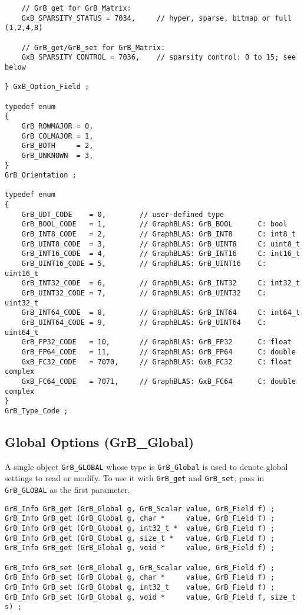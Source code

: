 {\begin{verbatim}
    // GrB_get for GrB_Matrix:
    GxB_SPARSITY_STATUS = 7034,     // hyper, sparse, bitmap or full (1,2,4,8)

    // GrB_get/GrB_set for GrB_Matrix:
    GxB_SPARSITY_CONTROL = 7036,    // sparsity control: 0 to 15; see below

} GxB_Option_Field ;

typedef enum
{
    GrB_ROWMAJOR = 0,
    GrB_COLMAJOR = 1,
    GrB_BOTH     = 2,
    GrB_UNKNOWN  = 3,
}
GrB_Orientation ;

typedef enum
{
    GrB_UDT_CODE    = 0,        // user-defined type
    GrB_BOOL_CODE   = 1,        // GraphBLAS: GrB_BOOL      C: bool
    GrB_INT8_CODE   = 2,        // GraphBLAS: GrB_INT8      C: int8_t
    GrB_UINT8_CODE  = 3,        // GraphBLAS: GrB_UINT8     C: uint8_t
    GrB_INT16_CODE  = 4,        // GraphBLAS: GrB_INT16     C: int16_t
    GrB_UINT16_CODE = 5,        // GraphBLAS: GrB_UINT16    C: uint16_t
    GrB_INT32_CODE  = 6,        // GraphBLAS: GrB_INT32     C: int32_t
    GrB_UINT32_CODE = 7,        // GraphBLAS: GrB_UINT32    C: uint32_t
    GrB_INT64_CODE  = 8,        // GraphBLAS: GrB_INT64     C: int64_t
    GrB_UINT64_CODE = 9,        // GraphBLAS: GrB_UINT64    C: uint64_t
    GrB_FP32_CODE   = 10,       // GraphBLAS: GrB_FP32      C: float
    GrB_FP64_CODE   = 11,       // GraphBLAS: GrB_FP64      C: double
    GxB_FC32_CODE   = 7070,     // GraphBLAS: GxB_FC32      C: float complex
    GxB_FC64_CODE   = 7071,     // GraphBLAS: GxB_FC64      C: double complex
}
GrB_Type_Code ; \end{verbatim}}


\subsection{Global Options ({\sf GrB\_Global})}
\label{get_set_global}

A single object \verb'GrB_GLOBAL' whose type is \verb'GrB_Global' is used to
denote global settings to read or modify.  To use it with \verb'GrB_get' and
\verb'GrB_set', pass in \verb'GrB_GLOBAL' as the first parameter.

\begin{mdframed}[userdefinedwidth=6in]
{\footnotesize
\begin{verbatim}
GrB_Info GrB_get (GrB_Global g, GrB_Scalar value, GrB_Field f) ;
GrB_Info GrB_get (GrB_Global g, char *     value, GrB_Field f) ;
GrB_Info GrB_get (GrB_Global g, int32_t *  value, GrB_Field f) ;
GrB_Info GrB_get (GrB_Global g, size_t *   value, GrB_Field f) ;
GrB_Info GrB_get (GrB_Global g, void *     value, GrB_Field f) ;

GrB_Info GrB_set (GrB_Global g, GrB_Scalar value, GrB_Field f) ;
GrB_Info GrB_set (GrB_Global g, char *     value, GrB_Field f) ;
GrB_Info GrB_set (GrB_Global g, int32_t    value, GrB_Field f) ;
GrB_Info GrB_set (GrB_Global g, void *     value, GrB_Field f, size_t s) ;
\end{verbatim}
}\end{mdframed}


